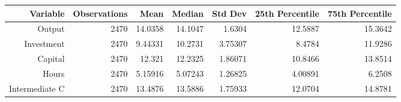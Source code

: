 \begin{tabular}{|r|r|r|r|r|r|r|}
  \hline
  \textbf{Variable} & \textbf{Observations} & \textbf{Mean} & \textbf{Median} & \textbf{Std Dev} & \textbf{25th Percentile} & \textbf{75th Percentile} \\\hline
  Output & 2470 & 14.0358 & 14.1047 & 1.6304 & 12.5887 & 15.3642 \\
  Investment & 2470 & 9.44331 & 10.2731 & 3.75307 & 8.4784 & 11.9286 \\
  Capital & 2470 & 12.321 & 12.2325 & 1.86071 & 10.8466 & 13.8514 \\
  Hours & 2470 & 5.15916 & 5.07243 & 1.26825 & 4.00891 & 6.2508 \\
  Intermediate C & 2470 & 13.4876 & 13.5886 & 1.75933 & 12.0704 & 14.8781 \\\hline
\end{tabular}
